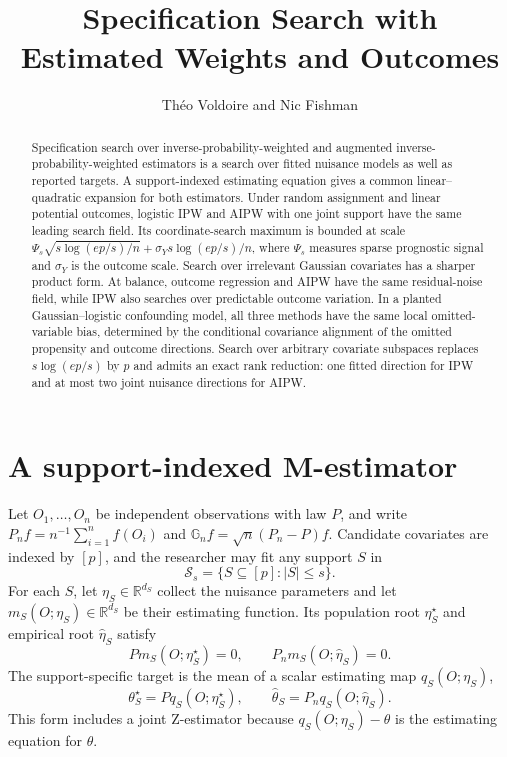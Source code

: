 \documentclass[a4paper,10pt,english]{article}
\title{Specification Search with Estimated Weights and Outcomes}
\author{Th\'eo Voldoire and Nic Fishman}
\date{}
\newcommand{\R}{\mathbb R}
\begin{document}
\maketitle

\begin{abstract}
Specification search over inverse-probability-weighted and augmented
inverse-probability-weighted estimators is a search over fitted nuisance
models as well as reported targets.  A support-indexed estimating equation
gives a common linear--quadratic expansion for both estimators.  Under
random assignment and linear potential outcomes, logistic IPW and AIPW with
one joint support have the same leading search field.  Its coordinate-search
maximum is bounded at scale
$\Psi_s\sqrt{s\log(ep/s)/n}+\sigma_Ys\log(ep/s)/n$, where $\Psi_s$ measures
sparse prognostic signal and $\sigma_Y$ is the outcome scale.  Search over
irrelevant Gaussian covariates has a sharper product form.  At balance,
outcome regression and AIPW have the same residual-noise field, while IPW
also searches over predictable outcome variation.  In a planted
Gaussian--logistic confounding model, all three methods have the same local
omitted-variable bias, determined by the conditional covariance alignment
of the omitted propensity and outcome directions.  Search over arbitrary
covariate subspaces replaces $s\log(ep/s)$ by $p$ and admits an exact rank
reduction: one fitted direction for IPW and at most two joint nuisance
directions for AIPW.
\end{abstract}

\section{A support-indexed M-estimator}

Let $O_1,\ldots,O_n$ be independent observations with law $P$, and write
$P_n f=n^{-1}\sum_{i=1}^n f(O_i)$ and
$\mathbb G_n f=\sqrt n(P_n-P)f$.  Candidate covariates are indexed by
$[p]$, and the researcher may fit any support $S$ in
\begin{equation*}
        \mathcal S_s=\{S\subseteq[p]:|S|\le s\}.
\end{equation*}
For each $S$, let $\eta_S\in\R^{d_S}$ collect the nuisance parameters and
let $m_S(O;\eta_S)\in\R^{d_S}$ be their estimating function.  Its
population root $\eta_S^\star$ and empirical root $\hat\eta_S$ satisfy
\begin{equation}\label{eq:nuisance-roots}
        Pm_S(O;\eta_S^\star)=0,
        \qquad
        P_nm_S(O;\hat\eta_S)=0.
\end{equation}
The support-specific target is the mean of a scalar estimating map
$q_S(O;\eta_S)$,
\begin{equation}\label{eq:target-definition}
        \theta_S^\star=Pq_S(O;\eta_S^\star),
        \qquad
        \hat\theta_S=P_nq_S(O;\hat\eta_S).
\end{equation}
This form includes a joint Z-estimator because $q_S(O;\eta_S)-\theta$ is
the estimating equation for $\theta$.
\end{document}
